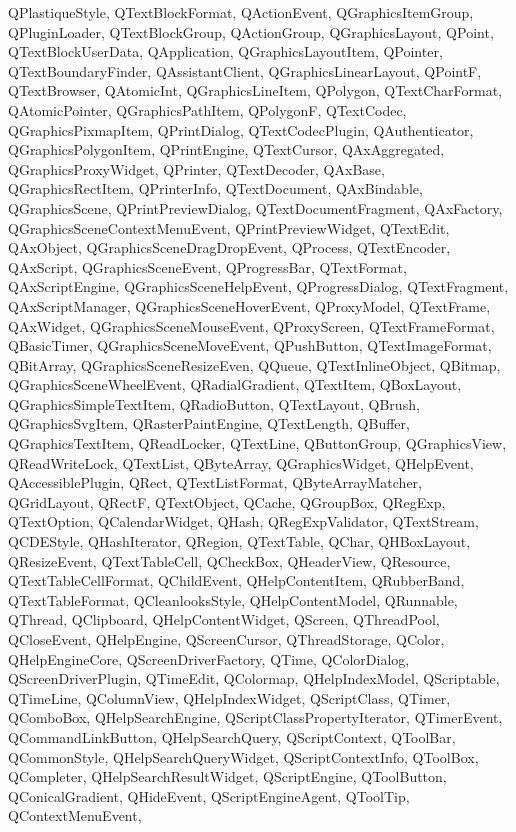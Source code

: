 {{	QPlastiqueStyle, QTextBlockFormat, QActionEvent, QGraphicsItemGroup, QPluginLoader, QTextBlockGroup, QActionGroup, QGraphicsLayout, QPoint, QTextBlockUserData, QApplication, QGraphicsLayoutItem, QPointer, QTextBoundaryFinder, QAssistantClient, QGraphicsLinearLayout, QPointF, QTextBrowser, QAtomicInt, QGraphicsLineItem, QPolygon, QTextCharFormat, QAtomicPointer, QGraphicsPathItem, QPolygonF, QTextCodec, QGraphicsPixmapItem, QPrintDialog, QTextCodecPlugin, QAuthenticator, QGraphicsPolygonItem, QPrintEngine, QTextCursor, QAxAggregated, QGraphicsProxyWidget, QPrinter, QTextDecoder, QAxBase, QGraphicsRectItem, QPrinterInfo, QTextDocument, QAxBindable, QGraphicsScene, QPrintPreviewDialog, QTextDocumentFragment, QAxFactory, QGraphicsSceneContextMenuEvent, QPrintPreviewWidget, QTextEdit, QAxObject, QGraphicsSceneDragDropEvent, QProcess, QTextEncoder, QAxScript, QGraphicsSceneEvent, QProgressBar,  QTextFormat, QAxScriptEngine, QGraphicsSceneHelpEvent, QProgressDialog, QTextFragment, QAxScriptManager, QGraphicsSceneHoverEvent, QProxyModel, QTextFrame, QAxWidget, QGraphicsSceneMouseEvent, QProxyScreen, QTextFrameFormat, QBasicTimer, QGraphicsSceneMoveEvent, QPushButton, QTextImageFormat, QBitArray, QGraphicsSceneResizeEven, QQueue, QTextInlineObject, QBitmap, QGraphicsSceneWheelEvent, QRadialGradient, QTextItem, QBoxLayout, QGraphicsSimpleTextItem, QRadioButton, QTextLayout, QBrush, QGraphicsSvgItem, QRasterPaintEngine, QTextLength, QBuffer, QGraphicsTextItem, QReadLocker, QTextLine, QButtonGroup, QGraphicsView, QReadWriteLock,
	QTextList, QByteArray, QGraphicsWidget, QHelpEvent, QAccessiblePlugin, QRect, QTextListFormat, QByteArrayMatcher, QGridLayout, QRectF, QTextObject, QCache, QGroupBox, QRegExp, QTextOption, QCalendarWidget, QHash, QRegExpValidator, QTextStream, QCDEStyle, QHashIterator, QRegion, QTextTable, QChar, QHBoxLayout, QResizeEvent, QTextTableCell, QCheckBox, QHeaderView, QResource,
	QTextTableCellFormat, QChildEvent, QHelpContentItem, QRubberBand, QTextTableFormat, QCleanlooksStyle, QHelpContentModel, QRunnable, QThread, QClipboard, QHelpContentWidget, QScreen, QThreadPool, QCloseEvent, QHelpEngine, QScreenCursor, QThreadStorage, QColor, QHelpEngineCore, QScreenDriverFactory, QTime, QColorDialog, QScreenDriverPlugin, QTimeEdit, QColormap, QHelpIndexModel, QScriptable, QTimeLine, QColumnView, QHelpIndexWidget, QScriptClass, QTimer, QComboBox, QHelpSearchEngine, QScriptClassPropertyIterator, QTimerEvent, QCommandLinkButton, QHelpSearchQuery, QScriptContext, QToolBar, QCommonStyle, QHelpSearchQueryWidget, QScriptContextInfo, QToolBox, QCompleter, QHelpSearchResultWidget, QScriptEngine, QToolButton, QConicalGradient, QHideEvent, QScriptEngineAgent, QToolTip, QContextMenuEvent,
}}
